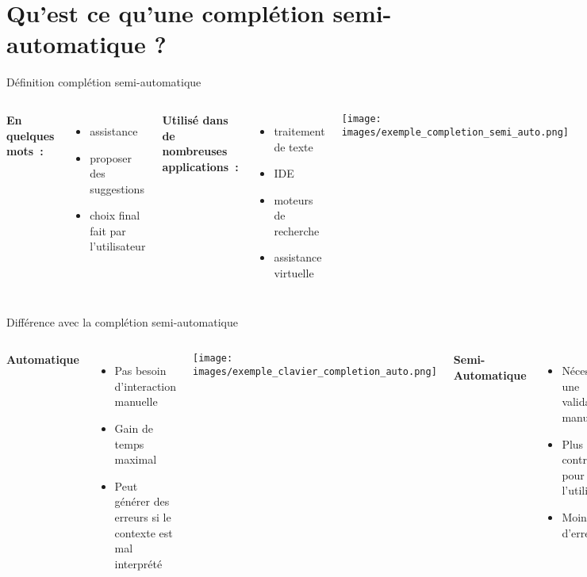 
\section{Qu'est ce qu'une complétion semi-automatique ?}

\begin{frame}{Définition complétion semi-automatique}
	\begin{columns}
		
		\textbf{En quelques mots~:}
		\begin{itemize}
			\item assistance
			\item proposer des suggestions
			\item choix final fait par l'utilisateur
		\end{itemize}
		\vfill	
		\textbf{Utilisé dans de nombreuses applications~:}
		\begin{itemize}
			\item traitement de texte
			\item IDE
			\item moteurs de recherche
			\item assistance virtuelle
		\end{itemize}
		\texttt{[image: images/exemple\_completion\_semi\_auto.png]}
		
	\end{columns}
\end{frame}


\begin{frame}{Différence avec la complétion semi-automatique}
	\begin{columns}
		\column{0.48\textwidth}
		\textbf{Automatique}
		\begin{itemize}
			\item Pas besoin d'interaction manuelle
			\item Gain de temps maximal
			\item Peut générer des erreurs si le contexte est mal interprété
		\end{itemize}
		\texttt{[image: images/exemple\_clavier\_completion\_auto.png]}
		
		\column{0.48\textwidth}
		\textbf{Semi-Automatique}
		\begin{itemize}
			\item Nécessite une validation manuelle
			\item Plus de contrôle pour l'utilisateur
			\item Moins d’erreurs
		\end{itemize}
		\texttt{[image: images/exemple\_clavier\_completion\_semi.png]}
	\end{columns}
\end{frame}

